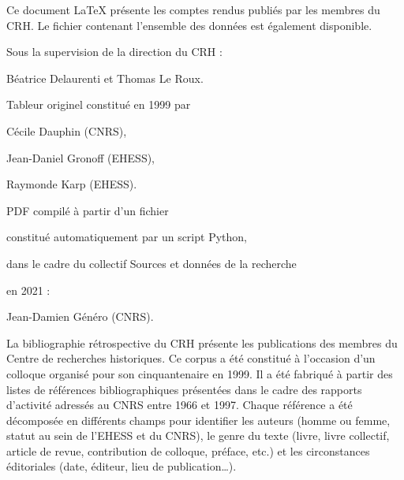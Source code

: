 \documentclass{article}
\begin{document}

\newpage
\thispagestyle{empty}

\begin{center}
	\begin{itshape}
		
		Ce document \LaTeX{} présente les comptes rendus publiés par les membres du CRH. Le fichier  contenant l'ensemble des données est également disponible.
		
		\bigskip
		
		Sous la supervision de la direction du CRH :
		
		Béatrice Delaurenti et Thomas Le Roux.
		
		\medskip
		
		Tableur originel constitué en 1999 par
		
		\medskip
		
		Cécile Dauphin (CNRS),
		
		Jean-Daniel Gronoff (EHESS),
		
		Raymonde Karp (EHESS).
		
		\bigskip
		
		PDF compilé à partir d'un fichier 
		
		constitué automatiquement par un script Python,
		
		dans le cadre du collectif \og Sources et données de la recherche \fg
		
		en 2021 :
		
		\medskip
		
		Jean-Damien Généro (CNRS).
		
		\bigskip
		
		La bibliographie rétrospective du CRH présente les publications des membres du Centre de recherches historiques. Ce corpus a été constitué à l’occasion d’un colloque organisé pour son cinquantenaire en 1999. Il a été fabriqué à partir des listes de références bibliographiques présentées dans le cadre des rapports d’activité adressés au CNRS entre 1966 et 1997. Chaque référence a été décomposée en différents champs pour identifier les auteurs (homme ou femme, statut au sein de l’EHESS et du CNRS), le genre du texte (livre, livre collectif, article de revue, contribution de colloque, préface, etc.) et les circonstances éditoriales (date, éditeur, lieu de publication…). 
		
		\bigskip
		

\end{itshape}
\end{center}
\end{document}
